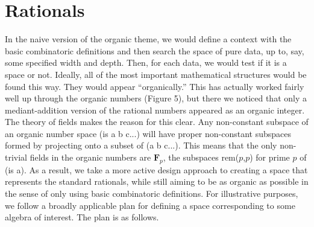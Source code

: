 \documentclass[11pt]{article}
\begin{document}
\section{Rationals} 

       In the naive version of the organic theme, we would define a context with the basic combinatoric definitions and then 
search the space of pure data, up to, say, some specified width and depth.  Then, for each data, we would test if it is 
a space or not.  Ideally, all of the most important mathematical structures would be found this way.  They would appear ``organically.'' 
This has actually worked fairly well up through the organic numbers (Figure 5), but there we noticed that only a mediant-addition 
version of the rational numbers appeared as an organic integer.  The theory of fields makes the reason for this clear.  
Any non-constant subspace of an organic number space (is a b c...) will have proper non-constant subspaces formed by 
projecting onto a subset of (a b c...).  This means that the only non-trivial fields in the organic numbers are ${\mathbf F}_p$, 
the subspaces rem($p$,$p$) for prime $p$ of (is a).  As a result, we take a more active design approach to creating a space that represents the standard rationals, while still aiming to be as organic as possible in the sense of only using basic combinatoric definitions.  For illustrative purposes, we follow a broadly applicable plan for defining a space corresponding to some algebra of interest.  The plan is as follows. 
 
\end{document}
